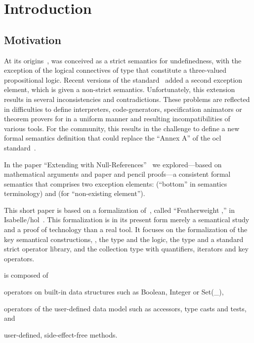 \part{Introduction}
\chapter{Motivation}
At its origins~\cite{richters:precise:2002,omg:ocl:1997}, \OCL was
conceived as a strict semantics for undefinedness, with the exception
of the logical connectives of type  that constitute
a three-valued propositional logic.  Recent versions of the \OCL
standard~\cite{omg:ocl:2006,omg:ocl:2012} added a second exception
element, which is given a non-strict semantics.  Unfortunately, this
extension results in several inconsistencies and contradictions. These
problems are reflected in difficulties to define interpreters,
code-generators, specification animators or theorem provers for \OCL
in a uniform manner and resulting incompatibilities of various
tools. For the \OCL community, this results in the challenge to define
a new formal semantics definition \OCL that could replace the ``Annex
A'' of the \acs{ocl} standard~\cite{omg:ocl:2012}.

In the paper ``Extending \OCL with
Null-References''~\cite{brucker.ea:ocl-null:2009} we explored---based
on mathematical arguments and paper and pencil proofs---a consistent
formal semantics that comprises two exception elements:
 (``bottom'' in semantics terminology) and
 (for ``non-existing element'').

This short paper is based on a formalization
of~\cite{brucker.ea:ocl-null:2009}, called ``Featherweight \OCL,'' in
Isabelle/\acs{hol}~\cite{nipkow.ea:isabelle:2002}.  This formalization
is in its present form merely a semantical study and a proof of
technology than a real tool. It focuses on the formalization of the
key semantical constructions, \ie, the type  and
the logic, the type  and a standard strict operator
library, and the collection type  with quantifiers,
iterators and key operators.


 \OCL is composed of
 \begin{inparaenum}[1)]
 \item operators on built-in data structures such as Boolean, Integer or Set(\_),
 \item operators of the user-defined data model such as accessors,
   type casts and tests, and
 \item user-defined, side-effect-free methods.
 \end{inparaenum}


